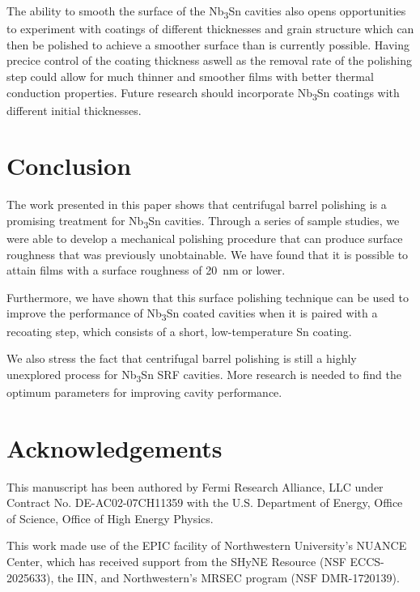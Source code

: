 \documentclass[reprint,amsmath,amssymb,aps]{revtex4-2}%
\begin{document}
The ability to smooth the surface of the Nb\textsubscript{3}Sn cavities also opens opportunities to experiment with coatings of different thicknesses and grain structure which can then be polished to achieve a smoother surface than is currently possible. Having precice control of the coating thickness aswell as the removal rate of the polishing step could allow for much thinner and smoother films with better thermal conduction properties. Future research should incorporate Nb\textsubscript{3}Sn coatings with different initial thicknesses.

%
\section{Conclusion}%
\label{sec:Conclusion}%
The work presented in this paper shows that centrifugal barrel polishing is a promising treatment for Nb\textsubscript{3}Sn cavities. Through a series of sample studies, we were able to develop a mechanical polishing procedure that can produce surface roughness that was previously unobtainable. We have found that it is possible to attain films with a surface roughness of 20~nm or lower. 

Furthermore, we have shown that this surface polishing technique can be used to improve the performance of Nb\textsubscript{3}Sn coated cavities when it is paired with a recoating step, which consists of a short, low-temperature Sn coating.

We also stress the fact that centrifugal barrel polishing is still a highly unexplored process for Nb\textsubscript{3}Sn SRF cavities. More research is needed to find the optimum parameters for improving cavity performance.

\section{Acknowledgements}
\label{sec:acknowledgements}
This manuscript has been authored by Fermi Research Alliance, LLC under Contract No. DE-AC02-07CH11359 with the U.S. Department of Energy, Office of Science, Office of High Energy Physics.

This work made use of the EPIC facility of Northwestern University’s NUANCE Center, which has received support from the SHyNE Resource (NSF ECCS-2025633), the IIN, and Northwestern's MRSEC program (NSF DMR-1720139).

%
%
\end{document}
